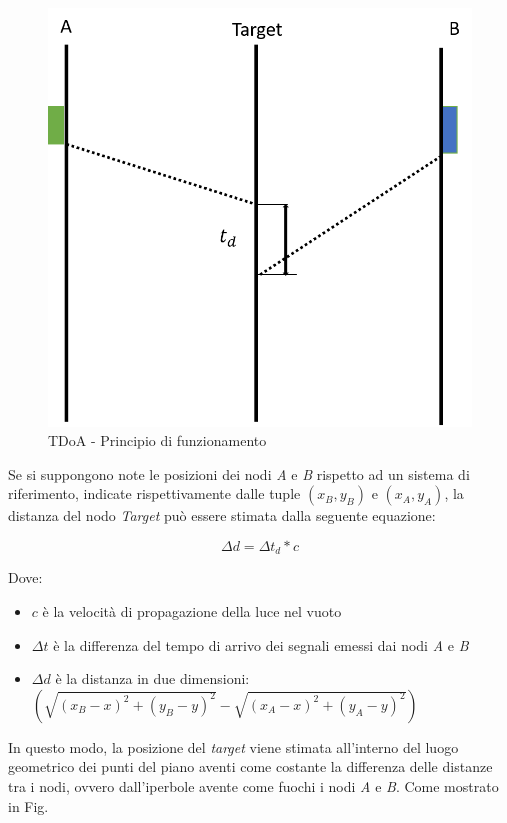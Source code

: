 \begin{figure}[H]  
	\centering 
	\includegraphics[scale=0.4]{ContestoApplicativo/tdoa.png}
	\caption{TDoA - Principio di funzionamento}
	\label{fig:tdoa}
\end{figure}
Se si suppongono note le posizioni dei nodi \textit{A} e \textit{B} rispetto ad un sistema di riferimento, indicate rispettivamente dalle tuple $(x_B,y_B)$ e $(x_A,y_A)$, la distanza del nodo \textit{Target} può essere stimata dalla seguente equazione:
 
\begin{equation}
\Delta d = \Delta t_d * c
\label{eq:tdoa}
\end{equation}

Dove:
\begin{itemize}
	\item $c$ è la velocità di propagazione della luce nel vuoto
	\item $ \Delta t$ è la differenza del tempo di arrivo dei segnali emessi dai nodi \textit{A} e \textit{B}
	\item $\Delta d$ è la distanza in due dimensioni: $(\sqrt{(x_B-x)^2 + (y_B-y)^2}- \sqrt{(x_A-x)^2 + (y_A-y)^2})$ 
\end{itemize}

In questo modo, la posizione del \textit{target} viene stimata all'interno del luogo geometrico dei punti del piano aventi come costante la differenza delle distanze tra i nodi, ovvero dall'iperbole avente come fuochi i nodi \textit{A} e \textit{B}. Come mostrato in Fig.

